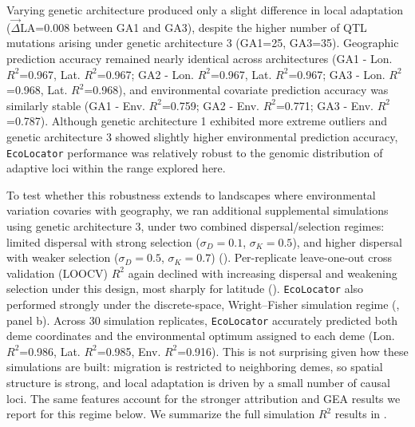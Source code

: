 \documentclass[]{article}
\newcommand{\ecolocator}{\texttt{EcoLocator}\xspace}
\begin{document}
Varying genetic architecture produced only a slight difference in local adaptation
($\vec{\Delta}$LA=0.008 between GA1 and GA3),
despite the higher number of QTL mutations arising
under genetic architecture 3 (GA1=25, GA3=35).
Geographic prediction accuracy remained nearly identical across architectures
(GA1 - Lon. $R^2$=0.967, Lat. $R^2$=0.967; 
GA2 - Lon. $R^2$=0.967, Lat. $R^2$=0.967; 
GA3 - Lon. $R^2$=0.968, Lat. $R^2$=0.968),
and environmental covariate prediction accuracy was similarly stable 
(GA1 - Env. $R^2$=0.759; 
GA2 - Env. $R^2$=0.771; 
GA3 - Env. $R^2$=0.787).
Although genetic architecture 1 
exhibited more extreme outliers and genetic architecture 3 showed slightly higher environmental prediction accuracy,
\ecolocator performance was relatively robust 
to the genomic distribution of adaptive loci within the range explored here. 

To test whether this robustness extends to landscapes where environmental 
variation covaries with geography, we ran additional supplemental simulations 
using genetic architecture 3, under two combined dispersal/selection 
regimes: limited dispersal with strong selection 
($\sigma_D=0.1$, $\sigma_K=0.5$), and higher dispersal with 
weaker selection ($\sigma_D=0.5$, $\sigma_K=0.7$) (). 
Per-replicate leave-one-out cross validation (LOOCV) $R^2$ 
again declined with 
increasing dispersal and weakening selection under this design, 
most sharply for latitude ().
\ecolocator also performed strongly under the discrete-space,
Wright--Fisher simulation regime (, panel b).
Across 30 simulation replicates,
\ecolocator accurately predicted both deme coordinates
and the environmental optimum assigned to each deme
(Lon. $R^2$=0.986,
Lat. $R^2$=0.985,
Env. $R^2$=0.916).
This is not surprising given how these simulations are built:
migration is restricted to neighboring demes,
so spatial structure is strong,
and local adaptation is driven by a small number of causal loci.
The same features account for the stronger attribution
and GEA results we report for this regime below.
We summarize the full simulation $R^2$ results in .
\end{document}
